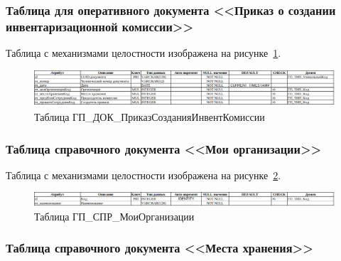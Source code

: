 
\subsubsection*{Таблица для оперативного документа <<Приказ о создании инвентаризационной комиссии>>}

Таблица с механизмами целостности изображена на рисунке~\ref{fig:Logic_DE_DOC_OrderCreationInventoryCommission}.

\begin{figure}[!h]
    \centering

    \includegraphics[width=18cm]
    {assets/database/Types/ГП_ДОК_ПриказСозданияИнвентКомиссии.png}

    \caption{Таблица ГП\_ДОК\_ПриказСозданияИнвентКомиссии}

    \label{fig:Logic_DE_DOC_OrderCreationInventoryCommission}
\end{figure}


\subsubsection*{Таблица справочного документа <<Мои организации>>}

Таблица с механизмами целостности изображена на рисунке~\ref{fig:Logic_DE_CTL_MyOrganization}.

\begin{figure}[!h]
    \centering

    \includegraphics[width=18cm]
    {assets/database/Types/ГП_СПР_МоиОрганизации.png}

    \caption{Таблица ГП\_СПР\_МоиОрганизации}

    \label{fig:Logic_DE_CTL_MyOrganization}
\end{figure}


\subsubsection*{Таблица справочного документа <<Места хранения>>}

